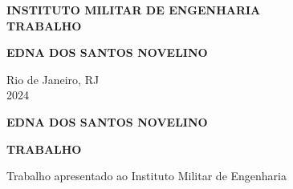 \documentclass[a4paper,12pt]{article}
\begin{document}
\thispagestyle{empty}
\begin{center}

\Large \textbf {INSTITUTO MILITAR DE ENGENHARIA} \\

\vspace{4 cm}
\Large \textbf {TRABALHO}

\vspace{5 cm}
\Large \textbf{EDNA DOS SANTOS NOVELINO}

\vspace{10 cm}
Rio de Janeiro, RJ \\
2024

\end{center}


\newpage

\thispagestyle{empty}

\begin{center}
\Large \textbf {EDNA DOS SANTOS NOVELINO}

\vspace{3 cm}
\Large \textbf {TRABALHO}
\end{center}

\vspace{3 cm}
\hfill \parbox {8 cm} {Trabalho apresentado ao Instituto Militar de Engenharia } %

\vspace{4 cm}


\newpage
\begin{abstract}
    
\end{abstract}
\end{document}
